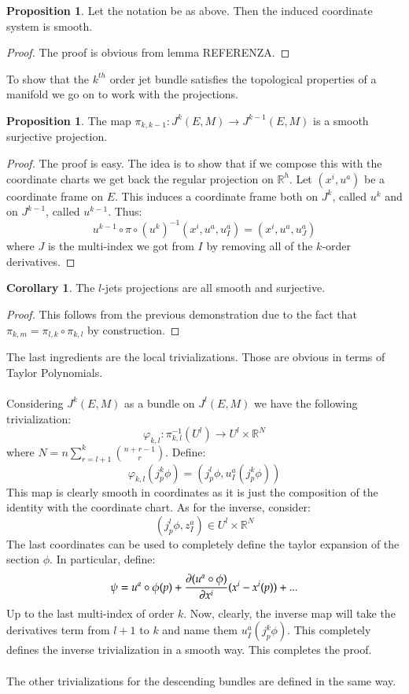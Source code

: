 \documentclass[12pt,a4paper]{report}
\theoremstyle{definition}
\theoremstyle{Theorem}
\newtheorem{Prop}[Def]{Proposition}
\theoremstyle{break}
\theoremstyle{definition}
\newtheorem{Cor}[Def]{Corollary}
\begin{document}
	\begin{Prop}
		Let the notation be as above. Then the induced coordinate system is smooth.
	\end{Prop}
	\begin{proof}
		The proof is obvious from lemma REFERENZA.
	\end{proof}
	To show that the $k^{th}$ order jet bundle satisfies the topological properties of a manifold we go on to work with the projections.
	\begin{Prop}
		The map $\pi_{k,k-1}:J^k(E,M)\longrightarrow J^{k-1}(E,M)$ is a smooth surjective projection.
	\end{Prop}
	\begin{proof}
		The proof is easy. The idea is to show that if we compose this with the coordinate charts we get back the regular projection on $\mathbb{R}^h$.
		Let $(x^i,u^a)$ be a coordinate frame on $E$. This induces a coordinate frame both on $J^k$, called $u^k$ and on $J^{k-1}$, called $u^{k-1}$. Thus:
		$$u^{k-1}\circ \pi\circ (u^k)^{-1}(x^i,u^a,u^a_I)=(x^i,u^a,u^a_J)$$
		where $J$ is the multi-index we got from $I$ by removing all of the $k$-order derivatives.
	\end{proof}
	\begin{Cor}
		The $l$-jets projections are all smooth and surjective.
	\end{Cor}
	\begin{proof}
		This follows from the previous demonstration due to the fact that $\pi_{k,m}=\pi_{l,k}\circ \pi_{k,l}$ by construction.
	\end{proof}
	The last ingredients are the local trivializations. Those are obvious in terms of Taylor Polynomials.\\
	\\
	Considering $J^k(E,M)$ as a bundle on $J^{l}(E,M)$ we have the following trivialization:
	$$\varphi_{k,l}:\pi^{-1}_{k,l}(U^{l})\longrightarrow U^{l}\times\mathbb{R}^{N}$$
	where $N=n\sum_{r=l+1}^{k}{n+r-1\choose r}$. Define:
	$$\varphi_{k,l}(j^k_p\phi)=(j^l_p\phi,u^a_I(j^k_p\phi))$$
	This map is clearly smooth in coordinates as it is just the composition of the identity with the coordinate chart. As for the inverse, consider:
	$$(j^l_p\phi,z^a_I)\in U^{l}\times\mathbb{R}^{N}$$
	The last coordinates can be used to completely define the taylor expansion of the section $\phi$. In particular, define:
	$$\psi=u^a\circ \phi(p)+{\partial (u^a\circ \phi)\over \partial x^i}(x^i-x^i(p))+...$$
	Up to the last multi-index of order $k$. Now, clearly, the inverse map will take the derivatives term from $l+1$ to $k$ and name them $u^a_I(j^k_p\phi)$. This completely defines the inverse trivialization in a smooth way. This completes the proof.\\
	\\
	The other trivializations for the descending bundles are defined in the same way.
\end{document}
